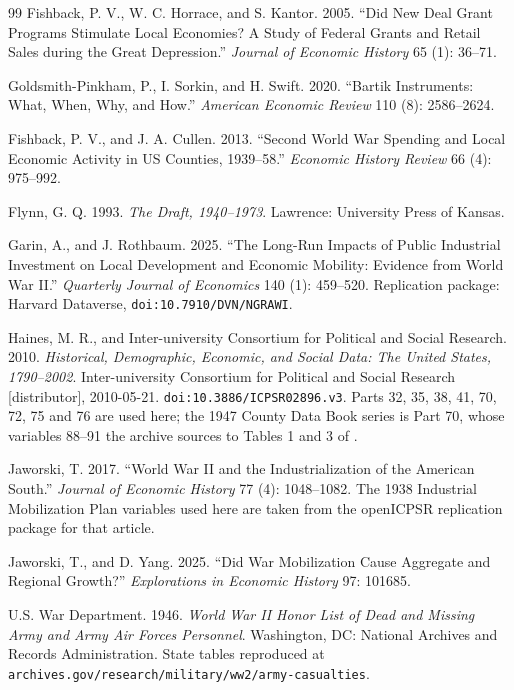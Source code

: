 \documentclass[12pt]{article}
\newcommand{\textcite}[1]{\citet{#1}}
\begin{document}
\begin{thebibliography}{99}
Fishback, P. V., W. C. Horrace, and S. Kantor. 2005. ``Did New Deal Grant Programs Stimulate Local Economies? A Study of Federal Grants and Retail Sales during the Great Depression.'' \emph{Journal of Economic History} 65 (1): 36--71.

Goldsmith-Pinkham, P., I. Sorkin, and H. Swift. 2020. ``Bartik Instruments: What, When, Why, and How.'' \emph{American Economic Review} 110 (8): 2586--2624.

Fishback, P. V., and J. A. Cullen. 2013. ``Second World War Spending and Local Economic Activity in US Counties, 1939--58.'' \emph{Economic History Review} 66 (4): 975--992.

Flynn, G. Q. 1993. \emph{The Draft, 1940--1973}. Lawrence: University Press of Kansas.

Garin, A., and J. Rothbaum. 2025. ``The Long-Run Impacts of Public Industrial Investment on Local Development and Economic Mobility: Evidence from World War II.'' \emph{Quarterly Journal of Economics} 140 (1): 459--520. Replication package: Harvard Dataverse, \texttt{doi:10.7910/DVN/NGRAWI}.

Haines, M. R., and Inter-university Consortium for Political and Social Research. 2010. \emph{Historical, Demographic, Economic, and Social Data: The United States, 1790--2002}. Inter-university Consortium for Political and Social Research [distributor], 2010-05-21. \texttt{doi:10.3886/ICPSR02896.v3}. Parts 32, 35, 38, 41, 70, 72, 75 and 76 are used here; the 1947 County Data Book series is Part 70, whose variables 88--91 the archive sources to Tables 1 and 3 of \textcite{cdb1947}.

Jaworski, T. 2017. ``World War II and the Industrialization of the American South.'' \emph{Journal of Economic History} 77 (4): 1048--1082. The 1938 Industrial Mobilization Plan variables used here are taken from the openICPSR replication package for that article.

Jaworski, T., and D. Yang. 2025. ``Did War Mobilization Cause Aggregate and Regional Growth?'' \emph{Explorations in Economic History} 97: 101685.

U.S. War Department. 1946. \emph{World War II Honor List of Dead and Missing Army and Army Air Forces Personnel}. Washington, DC: National Archives and Records Administration. State tables reproduced at \texttt{archives.gov/research/military/ww2/army-casualties}.


\end{thebibliography}
\end{document}
